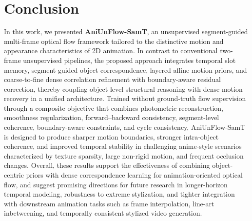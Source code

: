 \section{Conclusion}

In this work, we presented \textbf{AniUnFlow-SamT}, an unsupervised segment-guided multi-frame optical flow framework tailored to the distinctive motion and appearance characteristics of 2D animation. In contrast to conventional two-frame unsupervised pipelines, the proposed approach integrates temporal slot memory, segment-guided object correspondence, layered affine motion priors, and coarse-to-fine dense correlation refinement with boundary-aware residual correction, thereby coupling object-level structural reasoning with dense motion recovery in a unified architecture. Trained without ground-truth flow supervision through a composite objective that combines photometric reconstruction, smoothness regularization, forward--backward consistency, segment-level coherence, boundary-aware constraints, and cycle consistency, AniUnFlow-SamT is designed to produce sharper motion boundaries, stronger intra-object coherence, and improved temporal stability in challenging anime-style scenarios characterized by texture sparsity, large non-rigid motion, and frequent occlusion changes. Overall, these results support the effectiveness of combining object-centric priors with dense correspondence learning for animation-oriented optical flow, and suggest promising directions for future research in longer-horizon temporal modeling, robustness to extreme stylization, and tighter integration with downstream animation tasks such as frame interpolation, line-art inbetweening, and temporally consistent stylized video generation.